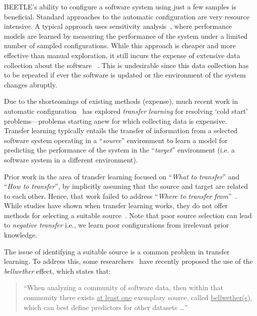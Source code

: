 \documentclass[10pt,journal,compsoc]{IEEEtran}
\begin{document}
BEETLE's ability to configure a software system using just a few samples is beneficial. Standard approaches to the automatic configuration are very resource intensive.  A typical approach uses sensitivity analysis~\cite{saltelli2000sensitivity}, where performance models are learned by measuring the performance of the system under a limited number of sampled configurations.
While this approach is cheaper and more effective than manual exploration,
it still incurs the expense of extensive data collection about the software ~\cite{guo2013variability, sarkar2015cost, siegmund2012predicting, 
nair2017faster, nair2017using, nair2018finding, oh2017finding, 
guo2017data,JC:MASCOTS16}. This is undesirable since this data collection has to be repeated if ever the software is updated
or the environment of the system changes abruptly. 
 
 


Due to the shortcomings of  existing methods (expense), much recent work in  automatic
configuration~\cite{Nam2013, Nam2015, Jing2015, kocaguneli2011find,kocaguneli2012,turhan09,peters15, krishna18} has explored   {\em transfer learning}  for resolving `cold start' problems---problems starting anew for which collecting data is expensive.
Transfer learning typically entails the transfer of information from a selected
 software system operating in a ``\textit{source}'' environment to learn a  model for predicting the performance of the system in the 
``\textit{target}'' environment (i.e. a software system in a different environment).  

Prior work in the area of transfer learning focused on ``\textit{What to transfer}'' and ``\textit{How to transfer}'', by implicitly assuming that the source and target are related to each other. Hence, that work failed to address ``\textit{Where to transfer from}''~\cite{pan2010survey}. While studies have shown when transfer learning works, they do not offer methods for selecting a suitable source~\cite{jamshidi2017transfer2}.
Note that poor source selection can lead to {\em negative transfer}
i.e., we learn poor configurations from irrelevant prior knowledge. 

The issue of identifying a suitable source is a common problem in transfer learning. To address this, some researchers~\cite{krishna16,mensah17a, 
mensah17b, krishna18} have recently proposed the use of the \textit{bellwether} effect, which states that:
\begin{quote}
    ``When analyzing a community of software data, then within that community 
    there exists \underline{at least one} exemplary source, called 
    \underline{bellwether(s)}, which can best define predictors for other 
    datasets \ldots''
\end{quote}
\end{document}
